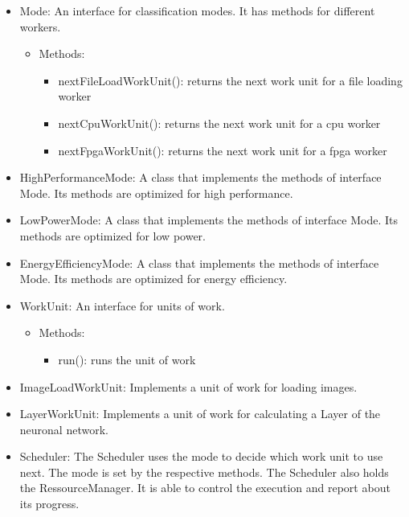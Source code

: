 \documentclass[parskip=full]{scrartcl}
\begin{document}
\begin{itemize}
	\item Mode: An interface for classification modes. It has methods for different workers.
	\begin{itemize}
		\item Methods:
		\begin{itemize}
			\item nextFileLoadWorkUnit(): returns the next work unit for a file loading worker
			\item nextCpuWorkUnit(): returns the next work unit for a cpu worker
			\item nextFpgaWorkUnit(): returns the next work unit for a fpga worker
		\end{itemize}
	\end{itemize}
	\item HighPerformanceMode: A class that implements the methods of interface Mode. Its methods are optimized for high performance.
	\item LowPowerMode: A class that implements the methods of interface Mode. Its methods are optimized for low power.
	\item EnergyEfficiencyMode: A class that implements the methods of interface Mode. Its methods are optimized for energy efficiency.
	\item WorkUnit: An interface for units of work.
	\begin{itemize}
		\item Methods:
		\begin{itemize}
			\item run(): runs the unit of work
		\end{itemize}
	\end{itemize}
	\item ImageLoadWorkUnit: Implements a unit of work for loading images.
	\item LayerWorkUnit: Implements a unit of work for calculating a Layer of the neuronal network.
	\item Scheduler: The Scheduler uses the mode to decide which work unit to use next. The mode is set by the respective methods. The Scheduler also holds the RessourceManager. It is able to control the execution and report about its progress.
\end{itemize}



\pagebreak
\end{document}
